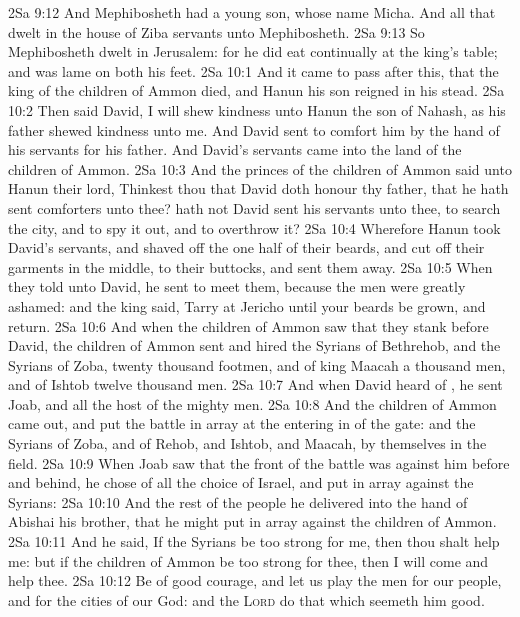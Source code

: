 \vs 2Sa 9:12 And Mephibosheth had a young son, whose name  Micha. And all that dwelt in the house of Ziba  servants unto Mephibosheth.
\vs 2Sa 9:13 So Mephibosheth dwelt in Jerusalem: for he did eat continually at the king's table; and was lame on both his feet.
\vs 2Sa 10:1 And it came to pass after this, that the king of the children of Ammon died, and Hanun his son reigned in his stead.
\vs 2Sa 10:2 Then said David, I will shew kindness unto Hanun the son of Nahash, as his father shewed kindness unto me. And David sent to comfort him by the hand of his servants for his father. And David's servants came into the land of the children of Ammon.
\vs 2Sa 10:3 And the princes of the children of Ammon said unto Hanun their lord, Thinkest thou that David doth honour thy father, that he hath sent comforters unto thee? hath not David  sent his servants unto thee, to search the city, and to spy it out, and to overthrow it?
\vs 2Sa 10:4 Wherefore Hanun took David's servants, and shaved off the one half of their beards, and cut off their garments in the middle,  to their buttocks, and sent them away.
\vs 2Sa 10:5 When they told  unto David, he sent to meet them, because the men were greatly ashamed: and the king said, Tarry at Jericho until your beards be grown, and  return.
\vs 2Sa 10:6 And when the children of Ammon saw that they stank before David, the children of Ammon sent and hired the Syrians of Bethrehob, and the Syrians of Zoba, twenty thousand footmen, and of king Maacah a thousand men, and of Ishtob twelve thousand men.
\vs 2Sa 10:7 And when David heard of , he sent Joab, and all the host of the mighty men.
\vs 2Sa 10:8 And the children of Ammon came out, and put the battle in array at the entering in of the gate: and the Syrians of Zoba, and of Rehob, and Ishtob, and Maacah,  by themselves in the field.
\vs 2Sa 10:9 When Joab saw that the front of the battle was against him before and behind, he chose of all the choice  of Israel, and put  in array against the Syrians:
\vs 2Sa 10:10 And the rest of the people he delivered into the hand of Abishai his brother, that he might put  in array against the children of Ammon.
\vs 2Sa 10:11 And he said, If the Syrians be too strong for me, then thou shalt help me: but if the children of Ammon be too strong for thee, then I will come and help thee.
\vs 2Sa 10:12 Be of good courage, and let us play the men for our people, and for the cities of our God: and the \textsc{Lord} do that which seemeth him good.
